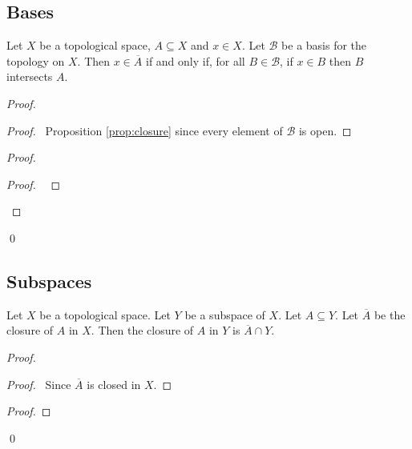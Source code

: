 \subsection{Bases}

\begin{prop}
\label{prop:closure_basis}
Let $X$ be a topological space, $A \subseteq X$ and $x \in X$. Let $\mathcal{B}$ be a basis for the topology on $X$. Then $x \in \overline{A}$ if and only if, for all $B \in \mathcal{B}$, if $x \in B$ then $B$ intersects $A$.
\end{prop}

\begin{proof}
\pf
{}
\begin{proof}
	\pf\ Proposition \ref{prop:closure} since every element of $\mathcal{B}$ is open.
\end{proof}
\begin{proof}
	\begin{proof}
		\pf\ 
	\end{proof}
\end{proof}
\qed
\end{proof}

\subsection{Subspaces}

\begin{prop}
Let $X$ be a topological space. Let $Y$ be a subspace of $X$. Let $A \subseteq Y$. Let $\overline{A}$ be the closure of $A$ in $X$. Then the closure of $A$ in $Y$ is $\overline{A} \cap Y$.
\end{prop}

\begin{proof}
\pf
{}
\begin{proof}
	\pf\ Since $\overline{A}$ is closed in $X$.
\end{proof}
\begin{proof}
\end{proof}
\qed
\end{proof}

